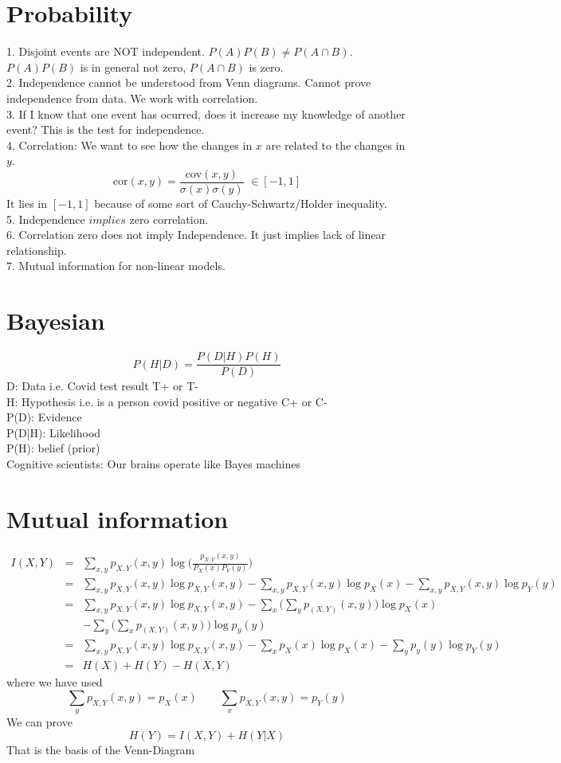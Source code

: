 \documentclass{article}
\newcommand{\beq}{\begin{equation}}
\newcommand{\eeq}{\end{equation}}
\newcommand{\ber}{\begin{eqnarray}}
\newcommand{\eer}{\end{eqnarray}}
\begin{document}
\section{Probability}
1. Disjoint events are NOT independent. $P(A)P(B)\ne{}P(A\cap{B})$. $P(A)P(B)$ is in general not zero, $P(A\cap{B})$ is zero.\\
2. Independence cannot be understood from Venn diagrams. Cannot prove independence from data. We work with correlation. \\
3. If I know that one event has ocurred, does it increase my knowledge of another event? This is the test for independence. \\
4. Correlation: We want to see how the changes in $x$ are related to the changes in $y$.\\
\beq
\text{cor}(x,y) = \frac{\text{cov}(x,y)}{\sigma(x)\sigma(y)}\,\,\in [-1,1] 
\eeq
It lies in $[-1,1]$ because of some sort of Cauchy-Schwartz/Holder inequality.\\
5. Independence $implies$ zero correlation.\\
6. Correlation zero does not imply Independence. It just implies lack of linear relationship.\\
7. Mutual information for non-linear models.
\section{Bayesian}
\beq
P(H|D) = \frac{P(D|H)P(H)}{P(D)}
\eeq
D: Data i.e. Covid test result T+ or T-\\
H: Hypothesis i.e. is a person covid positive or negative C+ or C-\\
P(D): Evidence\\
P(D|H): Likelihood\\
P(H): belief (prior)\\
Cognitive scientists: Our brains operate like Bayes machines
\section{Mutual information}
\ber
I(X,Y) &=& \sum_{x,y}p_{X,Y}(x,y)\log\Big(\frac{p_{X,Y}(x,y)}{P_X(x)P_Y(y)}\Big)\\
&=& \sum_{x,y}p_{X,Y}(x,y)\log{p_{X,Y}(x,y)} - \sum_{x,y}p_{X,Y}(x,y)\log{p_X(x)} - \sum_{x,y}p_{X,Y}(x,y)\log{p_Y(y)} \\
&=& \sum_{x,y}p_{X,Y}(x,y)\log{p_{X,Y}(x,y)} - \sum_{x}\Big(\sum_{y}p_(X,Y)(x,y)\Big)\log{p_X(x)} \nonumber \\ && - \sum_{y}\Big(\sum_{x}p_(X,Y)(x,y)\Big)\log{p_y(y)} \\
&=& \sum_{x,y}p_{X,Y}(x,y)\log{p_{X,Y}(x,y)} - \sum_{x}p_{X}(x)\log{p_X(x)} - \sum_{y}p_{y}(y)\log{p_Y(y)} \\
&=& H(X) + H(Y) - H(X,Y)
\eer
where we have used
\beq
\sum_{y}p_{X,Y}(x,y) = p_{X}(x) \qquad \sum_{x}p_{X,Y}(x,y) = p_{Y}(y)
\eeq
We can prove
\beq
H(Y) = I(X,Y) + H(Y|X)
\eeq
That is the basis of the Venn-Diagram
\end{document}

